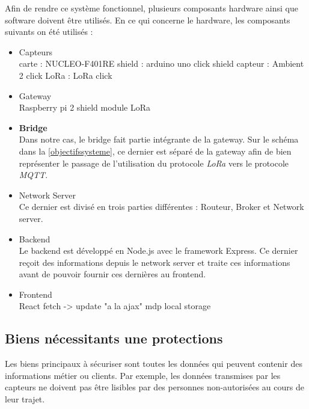 \documentclass[12pt]{article}
\begin{document}
Afin de rendre ce système fonctionnel, plusieurs composants hardware ainsi que software doivent être utilisés. En ce qui concerne le hardware, les composants suivants on été utilisés :

\begin{itemize}
	\item Capteurs \\
		carte : NUCLEO-F401RE
		shield : arduino uno click shield
		capteur : Ambient 2 click
		LoRa : LoRa click

	\item Gateway \\
		Raspberry pi 2
		shield
		module LoRa

	\item \textbf{Bridge} \\
		Dans notre cas, le bridge fait partie intégrante de la gateway. Sur le schéma dans la \autoref{objectifssysteme}, ce dernier est séparé de la gateway afin de bien représenter le passage de l'utilisation du protocole \textit{LoRa} vers le protocole \textit{MQTT}.

	\item Network Server \\
		Ce dernier est divisé en trois parties différentes : Routeur, Broker et Network server.

	\item Backend\\
		Le backend est développé en Node.js avec le framework Express. Ce dernier reçoit des informations depuis le network server et traite ces informations avant de pouvoir fournir ces dernières au frontend.

	\item Frontend\\
		React
		fetch -> update "a la ajax"
		mdp local storage

\end{itemize}

\subsection{Biens nécessitants une protections}

Les biens principaux à sécuriser sont toutes les données qui peuvent contenir des informations métier ou clients. Par exemple, les données transmises par les capteurs ne doivent pas être lisibles par des personnes non-autorisées au cours de leur trajet.
\end{document}
